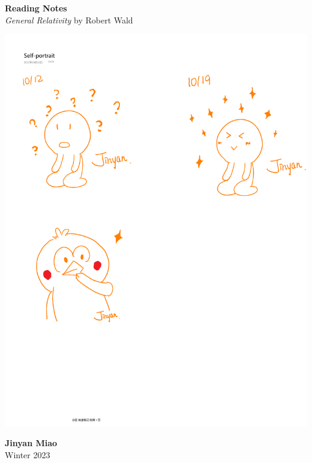 \documentclass[11pt, onesided]{book}
\theoremstyle{break}
\theoremstyle{break}
\begin{document}
	\begin{titlepage}
		\begin{center}
			\vspace*{0.5cm}
			\Huge \color{red}
				\textbf{Reading Notes}\\
			\vspace{0.5cm}			
			\Large \color{black}
			\textit{General Relativity} by Robert Wald\\
			\vspace{1.5cm}

			\includegraphics[scale=1.15]{hmm.pdf}
			
			
			\vspace{2cm}
			\LARGE
				\textbf{Jinyan Miao}\\
				\hfill\break
				\LARGE Winter 2023\\
			\vspace{1cm}

		\vspace*{\fill}
		\end{center}			
	\end{titlepage}
\end{document}
